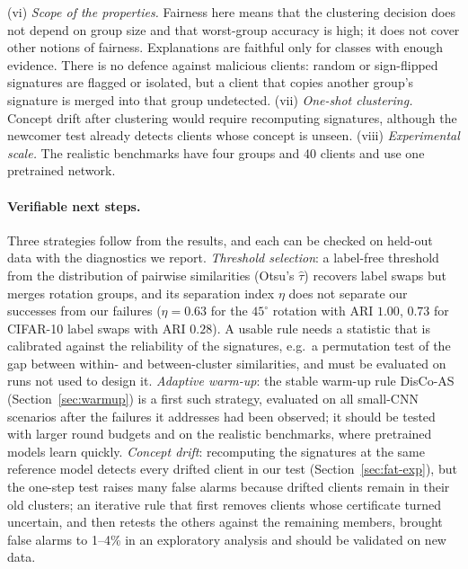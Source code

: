 (vi) \emph{Scope of the properties.} Fairness here means that the clustering decision does not depend on group size and that worst-group accuracy is high; it does not cover other notions of fairness. Explanations are faithful only for classes with enough evidence. There is no defence against malicious clients: random or sign-flipped signatures are flagged or isolated, but a client that copies another group's signature is merged into that group undetected.
(vii) \emph{One-shot clustering.} Concept drift after clustering would require recomputing signatures, although the newcomer test already detects clients whose concept is unseen.
(viii) \emph{Experimental scale.} The realistic benchmarks have four groups and 40 clients and use one pretrained network.

\paragraph{Verifiable next steps.} Three strategies follow from the results, and each can be checked on held-out data with the diagnostics we report. \emph{Threshold selection}: a label-free threshold from the distribution of pairwise similarities (Otsu's $\hat\tau$) recovers label swaps but merges rotation groups, and its separation index $\eta$ does not separate our successes from our failures ($\eta=0.63$ for the $45^\circ$ rotation with ARI $1.00$, $0.73$ for CIFAR-10 label swaps with ARI $0.28$). A usable rule needs a statistic that is calibrated against the reliability of the signatures, e.g.\ a permutation test of the gap between within- and between-cluster similarities, and must be evaluated on runs not used to design it. \emph{Adaptive warm-up}: the stable warm-up rule DisCo-AS (Section~\ref{sec:warmup}) is a first such strategy, evaluated on all small-CNN scenarios after the failures it addresses had been observed; it should be tested with larger round budgets and on the realistic benchmarks, where pretrained models learn quickly. \emph{Concept drift}: recomputing the signatures at the same reference model detects every drifted client in our test (Section~\ref{sec:fat-exp}), but the one-step test raises many false alarms because drifted clients remain in their old clusters; an iterative rule that first removes clients whose certificate turned uncertain, and then retests the others against the remaining members, brought false alarms to 1--4\% in an exploratory analysis and should be validated on new data.
